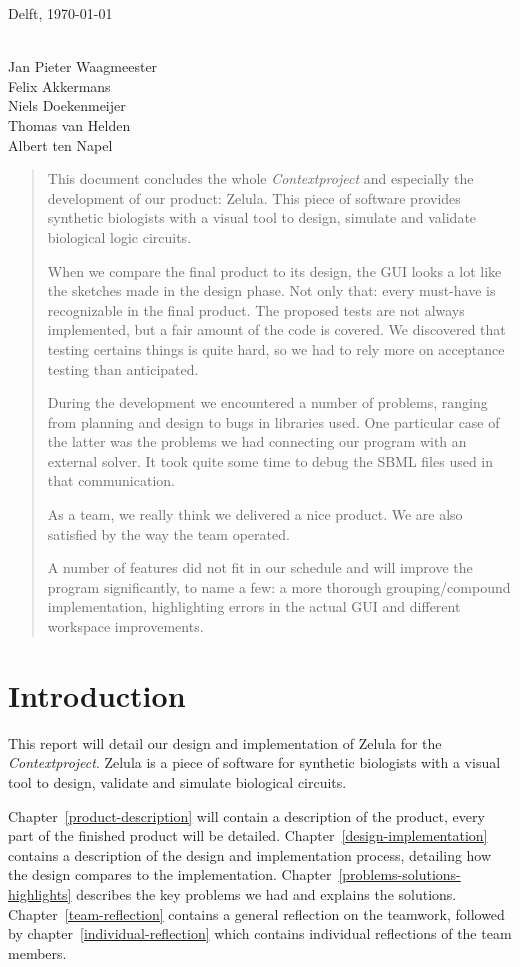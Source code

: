 \documentclass[a4paper]{article}
\begin{document}
Delft, \today \\ \\
\begin{flushright}Jan Pieter Waagmeester\\
Felix Akkermans\\
Niels Doekenmeijer\\
Thomas van Helden\\
Albert ten Napel\end{flushright}
\pagebreak
\begin{abstract}
\noindent This document concludes the whole \textit{Contextproject} and especially the development of our product: Zelula. This piece of software provides synthetic biologists with a visual tool to design, simulate and validate biological logic circuits.

When we compare the final product to its design, the GUI looks a lot like the sketches made in the design phase. Not only that: every must-have is recognizable in the final product.
The proposed tests are not always implemented, but a fair amount of the code is covered. We discovered that testing certains things is quite hard, so we had to rely more on acceptance testing than anticipated.

During the development we encountered a number of problems, ranging from planning and design to bugs in libraries used. One particular case of the latter was the problems we had connecting our program with an external solver. It took quite some time to debug the SBML files used in that communication.

As a team, we really think we delivered a nice product. We are also satisfied by the way the team operated.

A number of features did not fit in our schedule and will improve the program significantly, to name a few: a more thorough grouping/compound implementation, highlighting errors in the actual GUI and different workspace improvements.

\end{abstract}


\section{Introduction}
This report will detail our design and implementation of Zelula for the \textit{Contextproject}. Zelula is a piece of software for synthetic biologists with a visual tool to design, validate and simulate biological circuits.

Chapter~\ref{product-description} will contain a description of the product, every part of the finished product will be detailed. Chapter~\ref{design-implementation} contains a description of the design and implementation process, detailing how the design compares to the implementation. Chapter~\ref{problems-solutions-highlights} describes the key problems we had and explains the solutions. Chapter~\ref{team-reflection} contains a general reflection on the teamwork, followed by chapter~\ref{individual-reflection} which contains individual reflections of the team members.
\end{document}

